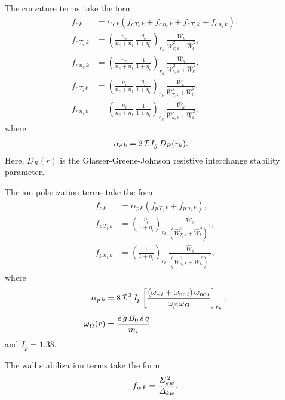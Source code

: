 \documentclass[notitlepage,12pt]{article}
\begin{document}
The curvature terms take the form
\begin{align}
f_{c\,k} &= \alpha_{c\,k}\left(f_{c\,T_e\,k} + f_{c\,n_e\,k} + f_{c\,T_i\,k} + f_{c\,n_i\,k}\right),\\[0.5ex]
f_{c\,T_e\,k}&=\left(\frac{n_e}{n_e+n_i}\,\frac{\eta_e}{1+\eta_e}\right)_{r_k}\,\frac{\hat{W}_k}{\hat{W}_{T_e\,k}^{\,2}+\hat{W}_k^{\,2}},\\[0.5ex]
f_{c\,n_e\,k}&=\left(\frac{n_e}{n_e+n_i}\,\frac{1}{1+\eta_e}\right)_{r_k}\,\frac{\hat{W}_k}{\hat{W}_{n_e\,k}^{\,2}+\hat{W}_k^{\,2}},\\[0.5ex]
f_{c\,T_i\,k}&=\left(\frac{n_i}{n_e+n_i}\,\frac{\eta_i}{1+\eta_i}\right)_{r_k}\,\frac{\hat{W}_k}{\hat{W}_{T_i\,k}^{\,2}+\hat{W}_k^{\,2}},\\[0.5ex]
f_{c\,n_i\,k}&=\left(\frac{n_i}{n_e+n_i}\,\frac{1}{1+\eta_i}\right)_{r_k}\,\frac{\hat{W}_k}{\hat{W}_{n_e\,k}^{\,2}+\hat{W}_k^{\,2}},
\end{align}
where
\begin{align}
\alpha_{c\,k} &= 2\,{\cal I}\,I_g\,D_R(r_k).
\end{align}
Here, $D_R(r)$ is the Glasser-Greene-Johnson resistive interchange stability parameter.

The ion polarization terms take the form
\begin{align}
f_{p\,k} &= \alpha_{p\,k}\left(f_{p\,T_i\,k} + f_{p\,n_i\,k}\right),\\[0.5ex]
f_{p\,T_i\,k}&=\left(\frac{\eta_i}{1+\eta_i}\right)_{r_k}\,\frac{\hat{W}_k}{(\hat{W}_{T_i\,k}^{\,2}+\hat{W}_k^{\,2})^{\,2}},\\[0.5ex]
f_{p\,n_i\,k}&=\left(\frac{1}{1+\eta_i}\right)_{r_k}\,\frac{\hat{W}_k}{(\hat{W}_{n_e\,k}^{\,2}+\hat{W}_k^{\,2})^{\,2}},
\end{align}
where
\begin{align}
\alpha_{p\,k} &= 8\,{\cal I}^{\,3}\, I_p\left[\frac{(\omega_{\ast\,i}+\omega_{{\rm nc}\,i})\,\omega_{{\rm nc}\,i}}{\omega_\beta\,\omega_{\mit\Omega}}\right]_{r_k},\\[0.5ex]
\omega_{\mit\Omega}(r)&= \frac{e\,g\,B_0\,s\,q}{m_i}
\end{align}
and  $I_p=1.38$. 

The wall stabilization terms take the form
\begin{equation}
f_{w\,k} = \frac{{\mit\Sigma}_{kw}^{\,2}}{{\mit\Delta}_{kw}}.
\end{equation}
\end{document}

